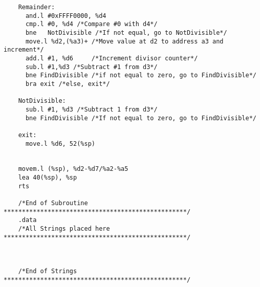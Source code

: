 \documentclass[10pt, letterpaper, titlepage]{article} %
\begin{document}
\begin{lstlisting}
	Remainder:
	  and.l #0xFFFF0000, %d4
	  cmp.l	#0, %d4 /*Compare #0 with d4*/
	  bne	NotDivisible /*If not equal, go to NotDivisible*/
	  move.l %d2,(%a3)+ /*Move value at d2 to address a3 and increment*/
	  add.l #1, %d6		/*Increment divisor counter*/
	  sub.l #1,%d3 /*Subtract #1 from d3*/
	  bne FindDivisible /*if not equal to zero, go to FindDivisible*/
	  bra exit /*else, exit*/
	
	NotDivisible:
	  sub.l #1, %d3 /*Subtract 1 from d3*/
	  bne FindDivisible /*If not equal to zero, go to FindDivisible*/
	
	exit:
	  move.l %d6, 52(%sp)
	
	
	movem.l (%sp), %d2-%d7/%a2-%a5
	lea 40(%sp), %sp
	rts
	
	/*End of Subroutine **************************************************/
	.data
	/*All Strings placed here **************************************************/
	
	
	
	/*End of Strings **************************************************/
\end{lstlisting}
\end{document}
